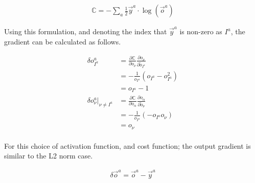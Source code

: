 \documentclass[../dissertation.tex]{subfiles}
\begin{document}
\begin{align}
    \mathbb{C} = - \sum_a \frac{1}{2} \vec{y}^a \cdot \log \left( \vec{o}^a \right)
\end{align}

Using this formulation, and denoting the index that $\vec{y}^a$ is non-zero as $I^a$, the gradient can be calculated as follows.

\begin{align}
    \delta o^a_{I^a} &  = \frac{\partial \mathbb{C}}{\partial o_\nu} \frac{\partial o_{\nu}}{\partial \tilde{o}_{I^a}} \\
                     &  = - \frac{1}{o_{I^a}} \left( o_{I^a} - o_{I^a}^2 \right) \\
                     &  = o_{I^a} - 1 \\
    \delta o^a_{\nu} \rvert_{\nu \neq I^a}
                     &  = \frac{\partial \mathbb{C}}{\partial o_\alpha} \frac{\partial o_{\alpha}}{\partial \tilde{o}_{\nu}} \\
                     &  = - \frac{1}{o_{I^a}} \left( - o_{I^a} o_\nu \right) \\
                     &  = o_{\nu} \\
\end{align}

For this choice of activation function, and cost function; the output gradient is similar to the L2 norm case.

\begin{align}
    \delta \vec{o}^a = \vec{o}^a - \vec{y}^a
\end{align}
\end{document}

